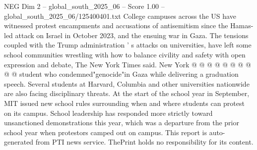 \begin{textsample}{NEG Dim 2 – global\_south\_2025\_06 – Score 1.00 – global\_south\_2025\_06/125400401.txt}
College campuses across the US have witnessed protest encampments and accusations of antisemitism since the Hamas-led attack on Israel in October 2023, and the ensuing war in Gaza.
The tensions coupled with the Trump administration ' s attacks on universities, have left some school communities wrestling with how to balance civility and safety with open expression and debate, The New York Times said.
New York @ @ @ @ @ @ @ @ @ @ student who condemned"genocide"in Gaza while delivering a graduation speech.
Several students at Harvard, Columbia and other universities nationwide are also facing disciplinary threats.
At the start of the school year in September, MIT issued new school rules surrounding when and where students can protest on its campus.
School leadership has responded more strictly toward unsanctioned demonstrations this year, which was a departure from the prior school year when protestors camped out on campus.
This report is auto-generated from PTI news service.
ThePrint holds no responsibility for its content.

\end{textsample}
